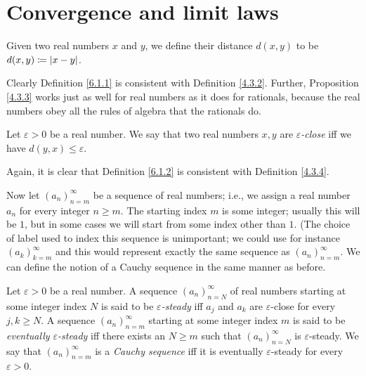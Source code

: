 \section{Convergence and limit laws}\label{sec 6.1}

\begin{definition}\label{6.1.1}
Given two real numbers \(x\) and \(y\), we define their distance \(d(x, y)\) to be \(d(x, y) \coloneqq \abs*{x - y}\).
\end{definition}

\begin{note}
Clearly Definition \ref{6.1.1} is consistent with Definition \ref{4.3.2}.
Further, Proposition \ref{4.3.3} works just as well for real numbers as it does for rationals, because the real numbers obey all the rules of algebra that the rationals do.
\end{note}

\begin{definition}\label{6.1.2}
Let \(\varepsilon > 0\) be a real number.
We say that two real numbers \(x, y\) are \emph{\(\varepsilon\)-close} iff we have \(d(y, x) \leq \varepsilon\).
\end{definition}

\begin{note}
Again, it is clear that Definition \ref{6.1.2} is consistent with Definition \ref{4.3.4}.
\end{note}

\begin{note}
Now let \((a_n)_{n = m}^\infty\) be a sequence of real numbers;
i.e., we assign a real number \(a_n\) for every integer \(n \geq m\).
The starting index \(m\) is some integer;
usually this will be \(1\), but in some cases we will start from some index other than \(1\).
(The choice of label used to index this sequence is unimportant; we could use for instance \((a_k)_{k = m}^{\infty}\) and this would represent exactly the same sequence as \((a_n)_{n = m}^{\infty}\).
We can define the notion of a Cauchy sequence in the same manner as before.
\end{note}

\begin{definition}\label{6.1.3}
Let \(\varepsilon > 0\) be a real number.
A sequence \((a_n)_{n = N}^\infty\) of real numbers starting at some integer index \(N\) is said to be \emph{\(\varepsilon\)-steady} iff \(a_j\) and \(a_k\) are \(\varepsilon\)-close for every \(j, k \geq N\).
A sequence \((a_n)_{n = m}^\infty\) starting at some integer index \(m\) is said to be \emph{eventually \(\varepsilon\)-steady} iff there exists an \(N \geq m\) such that \((a_n)_{n = N}^\infty\) is \(\varepsilon\)-steady.
We say that \((a_n)_{n = m}^\infty\) is a \emph{Cauchy sequence} iff it is eventually \(\varepsilon\)-steady for every \(\varepsilon > 0\).
\end{definition}


